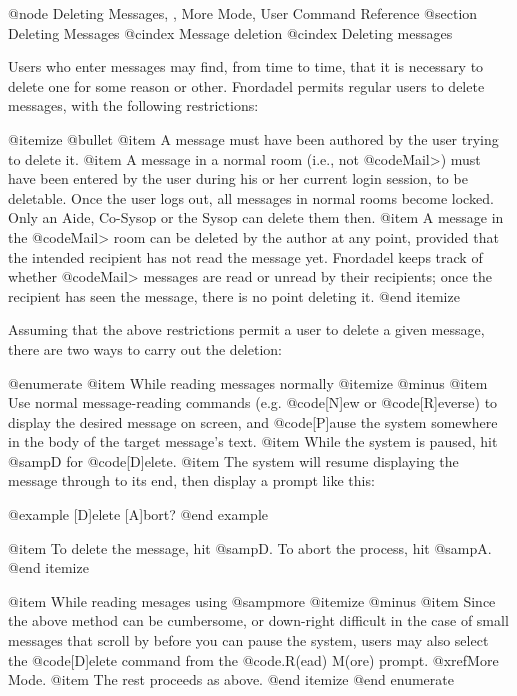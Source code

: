 @node Deleting Messages,  , More Mode, User Command Reference
@section Deleting Messages
@cindex Message deletion
@cindex Deleting messages

Users who enter messages may find, from time to time, that it is
necessary to delete one for some reason or other.  Fnordadel permits regular
users to delete messages, with the following restrictions:

@itemize @bullet
@item
A message must have been authored by the user trying to delete it.
@item
A message in a normal room (i.e., not @code{Mail>}) must have been entered
by the user during his or her current login session, to be deletable.
Once the user logs out, all messages in normal rooms become locked.
Only an Aide, Co-Sysop or the Sysop can delete them then.
@item
A message in the @code{Mail>} room can be deleted by the author at any
point, provided that the intended recipient has not read the message
yet.  Fnordadel keeps track of whether @code{Mail>} messages are read or
unread by their recipients; once the recipient has seen the message,
there is no point deleting it.
@end itemize

Assuming that the above restrictions permit a user to delete a given
message, there are two ways to carry out the deletion:

@enumerate
@item
While reading messages normally
@itemize @minus
@item
Use normal message-reading commands (e.g. @code{[N]ew} or @code{[R]everse})
to display the desired message on screen, and @code{[P]ause} the
system somewhere in the body of the target message's text.
@item
While the system is paused, hit @samp{D} for @code{[D]elete}.
@item
The system will resume displaying the message through to its
end, then display a prompt like this:

@example
[D]elete [A]bort?
@end example

@item
To delete the message, hit @samp{D}.  To abort the process, hit @samp{A}.
@end itemize

@item
While reading mesages using @samp{more}
@itemize @minus
@item
Since the above method can be cumbersome, or down-right difficult
in the case of small messages that scroll by before you
can pause the system, users may also select the @code{[D]elete}
command from the @code{.R(ead) M(ore)} prompt.  @xref{More Mode}.
@item
The rest proceeds as above.
@end itemize
@end enumerate
